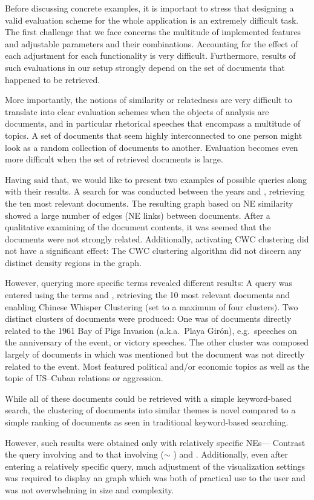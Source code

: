Before discussing concrete examples, it is important to stress that designing a valid evaluation scheme for the whole application is an extremely difficult task. The first challenge that we face concerns the multitude of implemented features and adjustable parameters and their combinations. Accounting for the effect of each adjustment for each functionality is very difficult. Furthermore, results of such evaluations in our setup strongly depend on the set of documents that happened to be retrieved.   

More importantly, the notions of similarity or relatedness are very difficult to translate into clear evaluation schemes when the objects of analysis are documents, and in particular rhetorical speeches that encompass a multitude of topics. A set of documents that seem highly interconnected to one person might look as a random collection of documents to another. Evaluation becomes even more difficult when the set of retrieved documents is large. 

Having said that, we would like to present two examples of possible queries along with their results.
A search for  was conducted between the years  and , retrieving the ten most relevant documents. The resulting graph based on NE similarity showed a large number of 
edges (NE links) between documents. After a qualitative examining of the document contents, it was seemed that the documents were not strongly related. Additionally, activating CWC clustering did not have a significant effect: The CWC clustering algorithm did not discern any distinct density regions in the graph.

However, querying more specific terms revealed different results: A query was entered using the terms  and , retrieving the 10 most relevant documents and enabling Chinese Whisper Clustering (set to a maximum of four clusters). Two distinct clusters of documents were produced: One was of documents directly related to the 1961 Bay of Pigs Invasion (a.k.a.\ Playa Gir\'{o}n), e.g.\ speeches on the anniversary of the event, or victory speeches. The other cluster was composed largely of documents in which  was mentioned but the document was not directly related to the event. Most featured political and/or economic topics as well as the topic of US--Cuban relations or aggression.

While all of these documents could be retrieved with a simple keyword-based search, the clustering of documents into similar themes is novel compared to a simple ranking of documents as seen in traditional keyword-based searching.

However, such results were obtained only with relatively specific NEs--- Contrast the query involving  and  to that involving  ($\sim$ )  and . Additionally, even after entering a relatively specific query, much adjustment of the visualization settings was required to display an graph which was both of practical use to the user and was not overwhelming in size and complexity.
